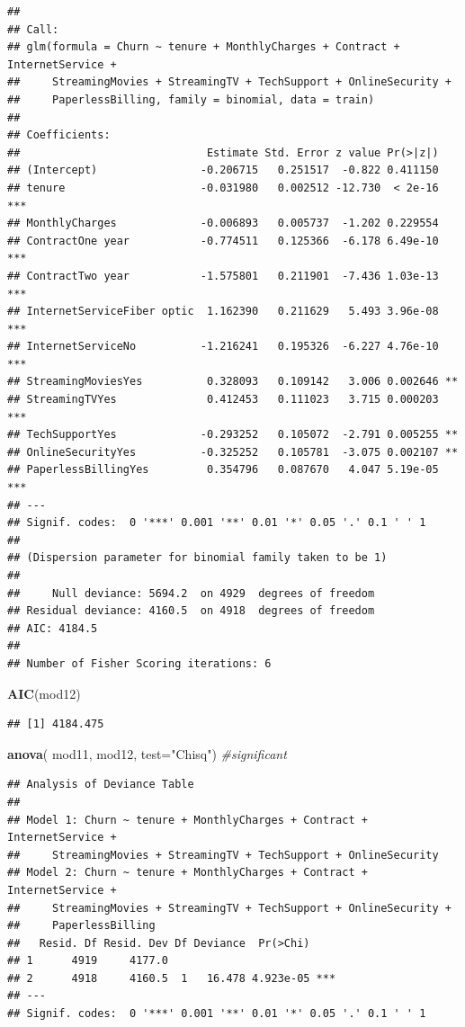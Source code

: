 \documentclass[
  twoside]{article}
\newenvironment{Shaded}{\begin{snugshade}}{\end{snugshade}}
\newcommand{\AttributeTok}[1]{\textcolor[rgb]{0.13,0.29,0.53}{#1}}
\newcommand{\CommentTok}[1]{\textcolor[rgb]{0.56,0.35,0.01}{\textit{#1}}}
\newcommand{\FunctionTok}[1]{\textcolor[rgb]{0.13,0.29,0.53}{\textbf{#1}}}
\newcommand{\NormalTok}[1]{#1}
\newcommand{\StringTok}[1]{\textcolor[rgb]{0.31,0.60,0.02}{#1}}
\begin{document}
\begin{verbatim}
## 
## Call:
## glm(formula = Churn ~ tenure + MonthlyCharges + Contract + InternetService + 
##     StreamingMovies + StreamingTV + TechSupport + OnlineSecurity + 
##     PaperlessBilling, family = binomial, data = train)
## 
## Coefficients:
##                             Estimate Std. Error z value Pr(>|z|)    
## (Intercept)                -0.206715   0.251517  -0.822 0.411150    
## tenure                     -0.031980   0.002512 -12.730  < 2e-16 ***
## MonthlyCharges             -0.006893   0.005737  -1.202 0.229554    
## ContractOne year           -0.774511   0.125366  -6.178 6.49e-10 ***
## ContractTwo year           -1.575801   0.211901  -7.436 1.03e-13 ***
## InternetServiceFiber optic  1.162390   0.211629   5.493 3.96e-08 ***
## InternetServiceNo          -1.216241   0.195326  -6.227 4.76e-10 ***
## StreamingMoviesYes          0.328093   0.109142   3.006 0.002646 ** 
## StreamingTVYes              0.412453   0.111023   3.715 0.000203 ***
## TechSupportYes             -0.293252   0.105072  -2.791 0.005255 ** 
## OnlineSecurityYes          -0.325252   0.105781  -3.075 0.002107 ** 
## PaperlessBillingYes         0.354796   0.087670   4.047 5.19e-05 ***
## ---
## Signif. codes:  0 '***' 0.001 '**' 0.01 '*' 0.05 '.' 0.1 ' ' 1
## 
## (Dispersion parameter for binomial family taken to be 1)
## 
##     Null deviance: 5694.2  on 4929  degrees of freedom
## Residual deviance: 4160.5  on 4918  degrees of freedom
## AIC: 4184.5
## 
## Number of Fisher Scoring iterations: 6
\end{verbatim}

\begin{Shaded}
\begin{Highlighting}[]
\FunctionTok{AIC}\NormalTok{(mod12)}
\end{Highlighting}
\end{Shaded}

\begin{verbatim}
## [1] 4184.475
\end{verbatim}

\begin{Shaded}
\begin{Highlighting}[]
\FunctionTok{anova}\NormalTok{( mod11, mod12,  }\AttributeTok{test=}\StringTok{"Chisq"}\NormalTok{) }\CommentTok{\#significant}
\end{Highlighting}
\end{Shaded}

\begin{verbatim}
## Analysis of Deviance Table
## 
## Model 1: Churn ~ tenure + MonthlyCharges + Contract + InternetService + 
##     StreamingMovies + StreamingTV + TechSupport + OnlineSecurity
## Model 2: Churn ~ tenure + MonthlyCharges + Contract + InternetService + 
##     StreamingMovies + StreamingTV + TechSupport + OnlineSecurity + 
##     PaperlessBilling
##   Resid. Df Resid. Dev Df Deviance  Pr(>Chi)    
## 1      4919     4177.0                          
## 2      4918     4160.5  1   16.478 4.923e-05 ***
## ---
## Signif. codes:  0 '***' 0.001 '**' 0.01 '*' 0.05 '.' 0.1 ' ' 1
\end{verbatim}
\end{document}
